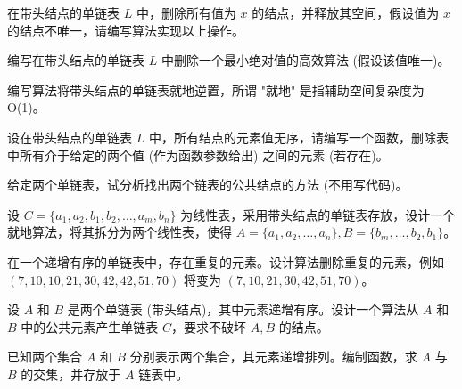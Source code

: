 \begin{qitems}

    \begin{bbox}
        \qitem 在带头结点的单链表 $L$ 中，删除所有值为 $x$ 的结点，并释放其空间，假设值为 $x$ 的结点不唯一，请编写算法实现以上操作。
    \end{bbox}

    \begin{bbox}
        \qitem 编写在带头结点的单链表 $L$ 中删除一个最小绝对值的高效算法 (假设该值唯一)。
    \end{bbox}

    \begin{bbox}
        \qitem 编写算法将带头结点的单链表就地逆置，所谓 "就地" 是指辅助空间复杂度为 O(1)。
    \end{bbox}

    \begin{bbox}
        \qitem 设在带头结点的单链表 $L$ 中，所有结点的元素值无序，请编写一个函数，删除表中所有介于给定的两个值 (作为函数参数给出) 之间的元素 (若存在)。
    \end{bbox}

    \begin{bbox}
        \qitem 给定两个单链表，试分析找出两个链表的公共结点的方法 (不用写代码)。
    \end{bbox}

    \begin{bbox}
        \qitem 设 $C = \{a_1, a_2, b_1, b_2, \dots, a_m, b_n\}$ 为线性表，采用带头结点的单链表存放，设计一个就地算法，将其拆分为两个线性表，使得 $A = \{a_1, a_2, \dots, a_n\}, B = \{b_m, \dots, b_2, b_1\}$。
    \end{bbox}

    \begin{bbox}
        \qitem 在一个递增有序的单链表中，存在重复的元素。设计算法删除重复的元素，例如 $(7, 10, 10, 21, 30, 42, 42, 51, 70)$ 将变为 $(7, 10, 21, 30, 42, 51, 70)$。
    \end{bbox}

    \begin{bbox}
        \qitem 设 $A$ 和 $B$ 是两个单链表 (带头结点)，其中元素递增有序。设计一个算法从 $A$ 和 $B$ 中的公共元素产生单链表 $C$，要求不破坏 $A, B$ 的结点。
    \end{bbox}

    \begin{bbox}
        \qitem 已知两个集合 $A$ 和 $B$ 分别表示两个集合，其元素递增排列。编制函数，求 $A$ 与 $B$ 的交集，并存放于 $A$ 链表中。
    \end{bbox}


\end{qitems}
